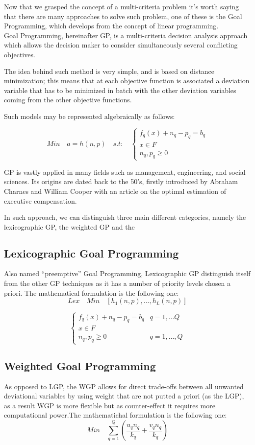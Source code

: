 \documentclass{article}
\begin{document}
Now that we grasped the concept of a multi-criteria problem it's worth saying that there are many approaches to solve such problem, one of these is the Goal Programming, which develops from the concept of linear programming.
\\
Goal Programming, hereinafter GP, is a multi-criteria decision analysis approach which allows the decision maker to consider simultaneously several conflicting objectives.

The idea behind such method is very simple, and is based on distance minimization; this means that at each objective function is associated a deviation variable that has to be minimized in batch with the other deviation variables coming from the other objective functions.

Such models may be represented algebraically as follows:

\[
Min \quad a=h(n,p) \quad s.t: \quad 
\begin{cases}
f_q(x)+n_q-p_q=b_q \\
x\in F \\
n_q,p_q\geq 0
\end{cases}
\]

GP is vastly applied in many fields\cite{tamiz_goal_1998} such as management, engineering, and social sciences. Its origins are dated back to the 50's, firstly introduced by Abraham Charnes and William Cooper\cite{charnes_optimal_1955} with an article on the optimal estimation of executive compensation. 

In such approach, we can distinguish three main different categories, namely the lexicographic GP, the weighted GP and the 

\subsection{Lexicographic Goal Programming}
Also named “preemptive” Goal Programming,  Lexicographic GP distinguish itself from the other GP techniques as it has a number of priority levels chosen a priori. The mathematical formulation is the following one:
\[
Lex \quad Min \quad [h_1(n,p),...,h_L(n,p)]
\]

\[
\begin{cases}
f_q(x)+n_q-p_q=b_q & q=1,...Q
\\
x\in F
\\
n_q,p_q\geq0 & q=1,...,Q
\end{cases}
\]

\subsection{Weighted Goal Programming}
As opposed to LGP, the WGP allows for direct trade-offs between all unwanted deviational variables by using weight that are not putted a priori (as the LGP), as a result WGP is more flexible but as counter-effect it requires more computational power.The mathematichal formulation is the following one:
\[
Min \quad \sum_{q=1}^{Q}(\frac{u_q n_q}{k_q}+\frac{v_q n_q}{k_q})
\]
\end{document}
